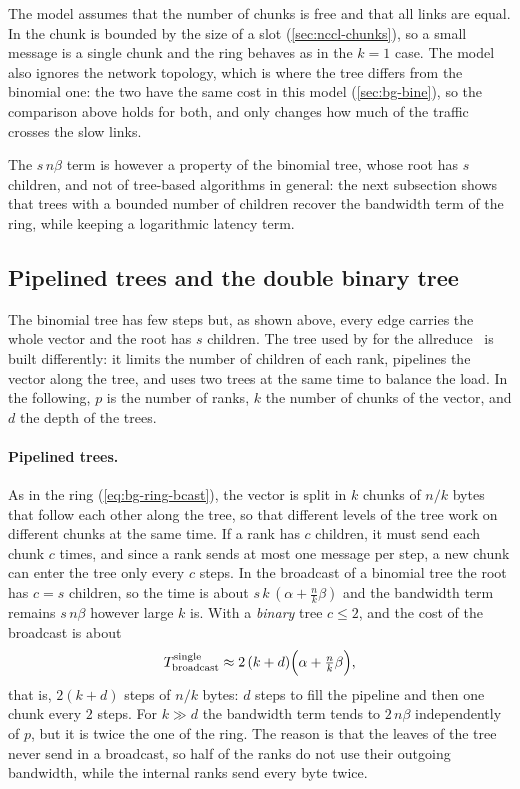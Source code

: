 The model assumes that the number of chunks is free and that all links are equal.
In \nccl{} the chunk is bounded by the size of a slot (\cref{sec:nccl-chunks}), so a small message is a single chunk and the ring behaves as in the $k=1$ case.
The model also ignores the network topology, which is where the \bine{} tree differs from the binomial one: the two have the same cost in this model (\cref{sec:bg-bine}), so the comparison above holds for both, and \bine{} only changes how much of the traffic crosses the slow links.

The $s\,n\beta$ term is however a property of the binomial tree, whose root has $s$ children, and not of tree-based algorithms in general: the next subsection shows that trees with a bounded number of children recover the bandwidth term of the ring, while keeping a logarithmic latency term.

\subsection{Pipelined trees and the double binary tree}\label{sec:bg-double-tree}

The binomial tree has few steps but, as shown above, every edge carries the whole vector and the root has $s$ children.
The tree used by \nccl{} for the allreduce~\cite{hu2025demystifying} is built differently: it limits the number of children of each rank, pipelines the vector along the tree, and uses two trees at the same time to balance the load.
In the following, $p$ is the number of ranks, $k$ the number of chunks of the vector, and $d$ the depth of the trees.

\paragraph{Pipelined trees.}
As in the ring (\cref{eq:bg-ring-bcast}), the vector is split in $k$ chunks of $n/k$ bytes that follow each other along the tree, so that different levels of the tree work on different chunks at the same time.
If a rank has $c$ children, it must send each chunk $c$ times, and since a rank sends at most one message per step, a new chunk can enter the tree only every $c$ steps.
In the broadcast of a binomial tree the root has $c=s$ children, so the time is about $s\,k\,(\alpha+\tfrac{n}{k}\beta)$ and the bandwidth term remains $s\,n\beta$ however large $k$ is.
With a \emph{binary} tree $c\le2$, and the cost of the broadcast is about
\begin{equation}
  T^{\text{single}}_{\text{broadcast}} \approx 2\,(k+d)\Bigl(\alpha+\tfrac{n}{k}\beta\Bigr),
  \label{eq:bg-single-binary}
\end{equation}
that is, $2(k+d)$ steps of $n/k$ bytes: $d$ steps to fill the pipeline and then one chunk every $2$ steps.
For $k\gg d$ the bandwidth term tends to $2\,n\beta$ independently of $p$, but it is twice the one of the ring.
The reason is that the leaves of the tree never send in a broadcast, so half of the ranks do not use their outgoing bandwidth, while the internal ranks send every byte twice.

